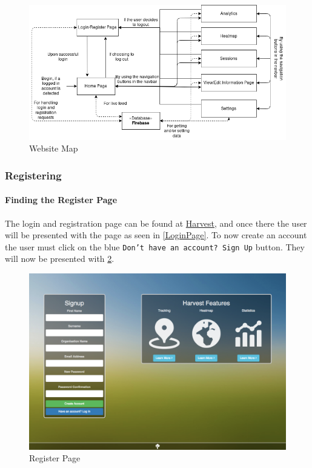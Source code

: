\documentclass[11pt]{article}
\begin{document}
\begin{figure}[h]
 \centering
 \includegraphics[width=12cm, keepaspectratio]{Images/webDiagramMap.png}
 \caption{Website Map}
 \label{WebsiteMap}
\end{figure}

\subsubsection{Registering}
\paragraph{Finding the Register Page}The login and registration page can be found at \href{https://harvestapp.co.za}{Harvest}, and once there the user will be presented with the page as seen in \ref{LoginPage}. To now create an account the user must click on the blue \texttt{Don't have an account? Sign Up} button. They will now be presented with \ref{RegisterPage}.

\begin{figure}
 \centering
 \includegraphics[width=12cm, keepaspectratio]{Images/GettingStarted/WebRegister.png}
 \caption{Register Page}
 \label{RegisterPage}
\end{figure}
\end{document}
